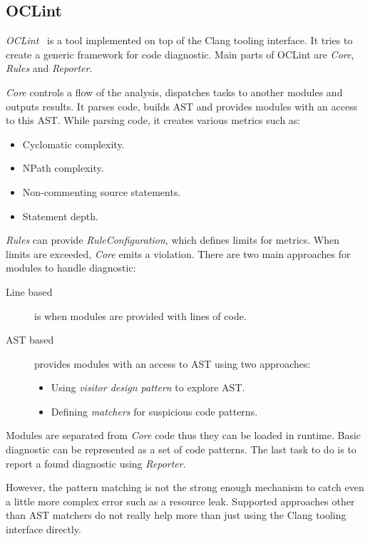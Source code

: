 \subsection{OCLint}
\emph{OCLint}~\cite{oclint} is a tool implemented on top of the Clang tooling interface. It tries to create  a generic framework for code diagnostic. Main parts of OCLint are \emph{Core}, \emph{Rules} and \emph{Reporter}.

\emph{Core} controls a flow of the analysis, dispatches tasks to another modules and outputs results. It parses code, builds AST and provides modules with an access to this AST. While parsing code, it creates various metrics such as:

\begin{itemize}
\item Cyclomatic complexity.
\item NPath complexity.
\item Non-commenting source statements.
\item Statement depth.
\end{itemize}

\emph{Rules} can provide \emph{RuleConfiguration}, which defines limits for metrics. When limits are exceeded, \emph{Core} emits a violation. There are two main approaches for modules to handle diagnostic:

\begin{description}
\item[Line based] is when modules are provided with lines of code.
\item[AST based] provides modules with an access to AST using two approaches:
	\begin{itemize}
	\item Using \emph{visitor design pattern} to explore AST.
	\item Defining \emph{matchers} for suspicious code patterns.
	\end{itemize}
\end{description}

Modules are separated from \emph{Core} code thus they can be loaded in runtime. Basic diagnostic can be represented as a set of code patterns. The last task to do is to report a found diagnostic using \emph{Reporter}.

However, the pattern matching is not the strong enough mechanism to catch even a little more complex error such as a resource leak. Supported approaches other than AST matchers do not really help more than just using the Clang tooling interface directly.

